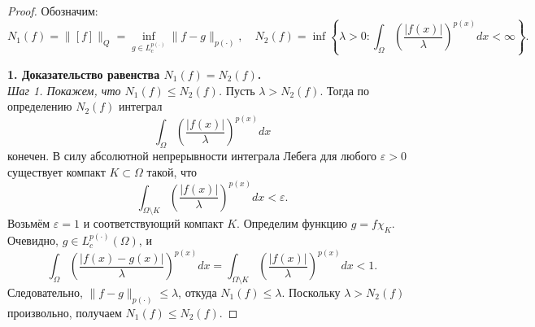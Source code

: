 \documentclass[../NDCNNAI_main.tex]{subfiles}
\begin{document}
\begin{proof}
Обозначим:
\[
N_1(f) = \|[f]\|_Q = \inf_{g \in L_c^{p(\cdot)}} \|f - g\|_{p(\cdot)}, \quad
N_2(f) = \inf\left\{ \lambda > 0 \colon \int_\Omega \left( \frac{|f(x)|}{\lambda} \right)^{p(x)} dx < \infty \right\}.
\]

\textbf{1. Доказательство равенства \( N_1(f) = N_2(f) \).} \\

\textit{Шаг 1. Покажем, что \( N_1(f) \leq N_2(f) \).}
Пусть \( \lambda > N_2(f) \). Тогда по определению \( N_2(f) \) интеграл 
\[
\int_\Omega \left( \frac{|f(x)|}{\lambda} \right)^{p(x)} dx
\]
конечен. В силу абсолютной непрерывности интеграла Лебега для любого \( \varepsilon > 0 \) существует компакт \( K \subset \Omega \) такой, что
\[
\int_{\Omega \setminus K} \left( \frac{|f(x)|}{\lambda} \right)^{p(x)} dx < \varepsilon.
\]
Возьмём \( \varepsilon = 1 \) и соответствующий компакт \( K \). Определим функцию \( g = f \chi_K \). Очевидно, \( g \in L_c^{p(\cdot)}(\Omega) \), и
\[
\int_\Omega \left( \frac{|f(x) - g(x)|}{\lambda} \right)^{p(x)} dx = \int_{\Omega \setminus K} \left( \frac{|f(x)|}{\lambda} \right)^{p(x)} dx < 1.
\]
Следовательно, \( \|f - g\|_{p(\cdot)} \leq \lambda \), откуда \( N_1(f) \leq \lambda \). Поскольку \( \lambda > N_2(f) \) произвольно, получаем \( N_1(f) \leq N_2(f) \).


\end{proof}
\end{document}
